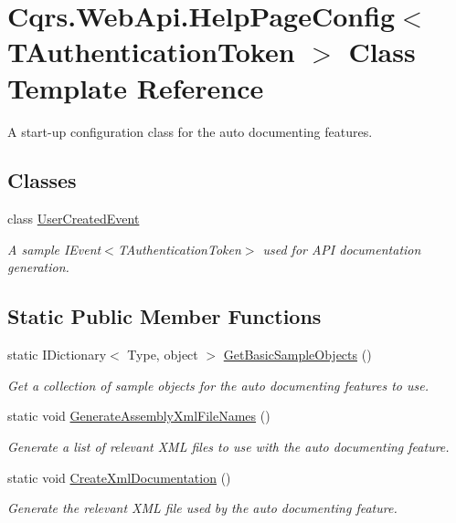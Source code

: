 \hypertarget{classCqrs_1_1WebApi_1_1HelpPageConfig}{}\section{Cqrs.\+Web\+Api.\+Help\+Page\+Config$<$ T\+Authentication\+Token $>$ Class Template Reference}
\label{classCqrs_1_1WebApi_1_1HelpPageConfig}


A start-\/up configuration class for the auto documenting features.  


\subsection*{Classes}
\begin{DoxyCompactItemize}
\item 
class \hyperlink{classCqrs_1_1WebApi_1_1HelpPageConfig_1_1UserCreatedEvent}{User\+Created\+Event}
\begin{DoxyCompactList}\small\item\em A sample I\+Event$<$\+T\+Authentication\+Token$>$ used for A\+PI documentation generation. \end{DoxyCompactList}\end{DoxyCompactItemize}
\subsection*{Static Public Member Functions}
\begin{DoxyCompactItemize}
\item 
static I\+Dictionary$<$ Type, object $>$ \hyperlink{classCqrs_1_1WebApi_1_1HelpPageConfig_a9015771102b0ab21da20a0684fe6a88a_a9015771102b0ab21da20a0684fe6a88a}{Get\+Basic\+Sample\+Objects} ()
\begin{DoxyCompactList}\small\item\em Get a collection of sample objects for the auto documenting features to use. \end{DoxyCompactList}\item 
static void \hyperlink{classCqrs_1_1WebApi_1_1HelpPageConfig_afc36e0fcbf46ecda7770656373dbd46c_afc36e0fcbf46ecda7770656373dbd46c}{Generate\+Assembly\+Xml\+File\+Names} ()
\begin{DoxyCompactList}\small\item\em Generate a list of relevant X\+ML files to use with the auto documenting feature. \end{DoxyCompactList}\item 
static void \hyperlink{classCqrs_1_1WebApi_1_1HelpPageConfig_a9dc5b7b2b644637cd8216ffaac68d545_a9dc5b7b2b644637cd8216ffaac68d545}{Create\+Xml\+Documentation} ()
\begin{DoxyCompactList}\small\item\em Generate the relevant X\+ML file used by the auto documenting feature. \end{DoxyCompactList}\end{DoxyCompactItemize}
